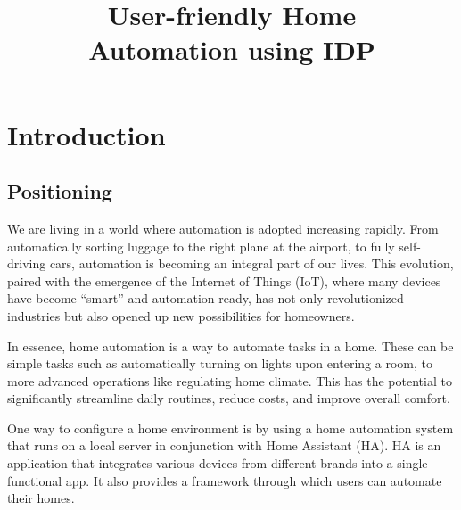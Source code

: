 \documentclass[11pt,a4paper]{report}
\title{User-friendly Home\\ Automation using IDP}
\subtitle{}
\begin{document}
\preface%

\printnoidxglossary[type=\acronymtype]%
\clearpage

%
%
%





\chapter{Introduction}
\section{Positioning}
We are living in a world where automation is adopted increasing rapidly. From automatically sorting luggage to the right plane at the airport, to fully self-driving cars, automation is becoming an integral part of our lives. This evolution, paired with the emergence of the Internet of Things (IoT), where many devices have become ``smart'' and automation-ready, has not only revolutionized industries but also opened up new possibilities for homeowners.

In essence, home automation is a way to automate tasks in a home. These can be simple tasks such as automatically turning on lights upon entering a room, to more advanced operations like regulating home climate. This has the potential to significantly streamline daily routines, reduce costs, and improve overall comfort.

One way to configure a home environment is by using a home automation system that runs on a local server in conjunction with Home Assistant (HA). HA is an application that integrates various devices from different brands into a single functional app. It also provides a framework through which users can automate their homes.
\end{document}
